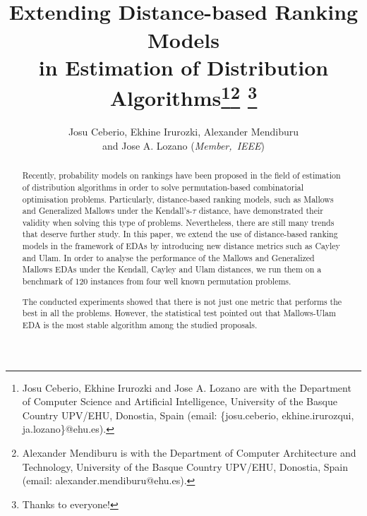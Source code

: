 \documentclass[conference]{IEEEtran}
\begin{document}
\title{\ \\ \LARGE Extending Distance-based Ranking Models\\ in Estimation of Distribution Algorithms\thanks{Josu Ceberio, Ekhine Irurozki  and Jose A. Lozano are with the Department of Computer Science and Artificial Intelligence, University of the Basque Country UPV/EHU, Donostia, Spain (email: \{josu.ceberio, ekhine.irurozqui, ja.lozano\}@ehu.es).}\thanks{Alexander Mendiburu is with the Department of Computer Architecture and Technology, University of the Basque Country UPV/EHU, Donostia, Spain (email: alexander.mendiburu@ehu.es).} \thanks{Thanks to everyone!}}

\author{Josu Ceberio, Ekhine Irurozki, Alexander Mendiburu \\and Jose A. Lozano  (\textit{Member,~IEEE})}


\maketitle

\begin{abstract}
Recently, probability models on rankings have been proposed in the field of estimation of distribution algorithms in order to solve permutation-based combinatorial optimisation problems. Particularly, distance-based ranking models, such as Mallows and Generalized Mallows under the Kendall's-$\tau$ distance, have demonstrated their validity when solving this type of problems. Nevertheless, there are still many trends that deserve further study. In this paper, we extend the use of distance-based ranking models in the framework of EDAs by introducing new distance metrics such as Cayley and Ulam. In order to analyse the performance of the Mallows and Generalized Mallows EDAs under the Kendall, Cayley and Ulam distances, we run them on a benchmark of 120 instances from four well known permutation problems.

The conducted experiments showed that there is not just one metric that performs the best in all the problems. However, the statistical test pointed out that Mallows-Ulam EDA is the most stable algorithm among the studied proposals.
\end{abstract}
\end{document}
